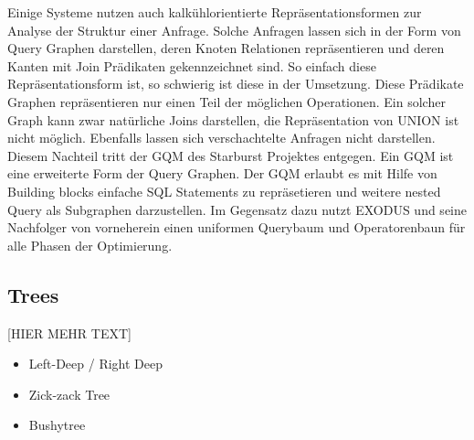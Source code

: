 Einige Systeme nutzen auch kalkühlorientierte Repräsentationsformen zur Analyse der Struktur einer Anfrage. Solche Anfragen lassen sich in der Form von Query Graphen darstellen, deren Knoten Relationen repräsentieren und deren Kanten mit Join Prädikaten gekennzeichnet sind. So einfach diese Repräsentationsform ist, so schwierig ist diese in der Umsetzung. Diese Prädikate Graphen repräsentieren nur einen Teil der möglichen Operationen. Ein solcher Graph kann zwar natürliche Joins darstellen, die Repräsentation von UNION ist nicht möglich. Ebenfalls lassen sich verschachtelte Anfragen nicht darstellen. Diesem Nachteil tritt der GQM des Starburst Projektes entgegen. Ein GQM ist eine erweiterte Form der Query Graphen. Der GQM erlaubt es mit Hilfe von Building blocks einfache SQL Statements zu repräsetieren und weitere nested Query als Subgraphen darzustellen. Im Gegensatz dazu nutzt EXODUS und seine Nachfolger von vorneherein einen uniformen Querybaum und Operatorenbaun für alle Phasen der Optimierung.



\subsection{Trees}

[HIER MEHR TEXT]
\cite{ioannidis1991left}
\begin{itemize}
\item Left-Deep / Right Deep
\item Zick-zack Tree
\item Bushytree
\end{itemize}